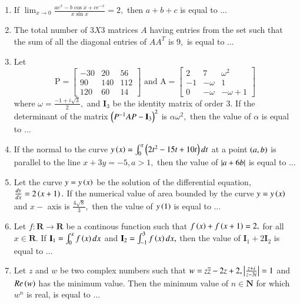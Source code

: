 \documentclass[journal,12pt,twocolumn]{IEEEtran}
\theoremstyle{remark}
\begin{document}
\begin{enumerate}[start=16]
    \item If $\lim_{x \to 0}\frac{ae^x-b\cos x+ce^{-x}}{x\sin x}=2,$ then $a+b+c$ is equal to $\dots$\\
    \item The total number of $3 X 3$ matrices $A$ having entries from the set  such that the sum of all the diagonal entries of $AA^T$ is $9,$ is equal to $\dots$\\
    \item Let $$\text{P} = \begin{bmatrix}
-30 & 20  & 56 \\
90  & 140 & 112 \\
120 & 60  & 14
\end{bmatrix} \text{ and A} =
\begin{bmatrix}
2  & 7  & \omega^2 \\
-1 & -\omega & 1 \\
0  & -\omega & -\omega + 1
\end{bmatrix}$$ where $\omega =\frac{-1+i\sqrt{3}}{2},$ and $\textbf{I}_3$ be the identity matrix of order $3.$ If the determinant of the matrix $\left(P^{-1}AP-\textbf{I}_3\right)^2$ is $\alpha\omega^2,$ then the value of $\alpha$ is equal to $\dots$\\
\item If the normal to the curve $y\left(x\right)=\int_0^x\left(2t^2-15t+10t\right)dt$ at a point $\left(a,b\right)$ is parallel to the line $x+3y=-5, a>1,$ then the value of $\left\vert a+6b\right\vert$ is equal to $\dots$\\
\item Let the curve $y=y\left(x\right)$ be the solution of the differential equation, $\frac{dy}{dx}=2\left(x+1\right).$ If the numerical value of area bounded by the curve $y=y\left(x\right)$ and $x-$ axis is $\frac{4\sqrt{8}}{3},$ then the value of $y\left(1\right)$ is equal to $\dots$\\
\item Let $f : \textbf{R} \to \textbf{R}$ be a continous function such that $f\left(x\right)+f\left(x+1\right)=2,$ for all $x \in \textbf{R}.$ If $\textbf{I}_1=\int_0^xf\left(x\right)dx$ and $\textbf{I}_2=\int_{-1}^3f\left(x\right)dx,$ then the value of $\textbf{I}_1 +2\textbf{I}_2$ is equal to $\dots$\\
\item Let $z$ and $w$ be two complex numbers such that $w=z\overline{z}-2z+2, \left\vert\frac{z+i}{z-3i}\right\vert=1$ and $Re\left(w\right)$ has the minimum value. Then the minimum value of $n \in \textbf{N}$ for which $w^n$ is real, is equal to $\dots$
\end{enumerate}
\end{document}
